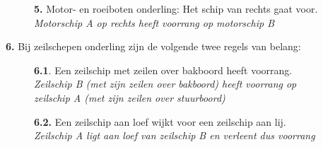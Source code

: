 \vspace{-0.7cm}
\begin{figure}[H]
	\centering
	\begin{minipage}[t]{0.70\textwidth}
		\textbf{5.} Motor- en roeiboten onderling: Het schip van rechts gaat voor.\\
		\textit{Motorschip A op rechts heeft voorrang op motorschip B}
	\end{minipage}
	\hfill
	\begin{minipage}[t]{0.20\textwidth}
		\label{pic:kr5}
	\end{minipage}
	\hfill
\end{figure}

\vspace{-0.7cm}

\textbf{6.} Bij zeilschepen onderling zijn de volgende twee regels van belang:
\vspace{-0.5cm}
\begin{figure}[H]
	\centering
	\hspace{0.02\textwidth}
	\begin{minipage}[t]{0.70\textwidth}
		\textbf{6.1}. Een zeilschip met zeilen over bakboord heeft voorrang.\\
		\textit{Zeilschip B (met zijn zeilen over bakboord) heeft voorrang op \\zeilschip A (met zijn zeilen over stuurboord)}
	\end{minipage}
	\hfill
	\begin{minipage}[t]{0.20\textwidth}
		\label{pic:kr41}
	\end{minipage}
	\hfill
\end{figure}

\vspace{-0.7cm}
\begin{figure}[H]
	\centering
	\hspace{0.02\textwidth}
	\begin{minipage}[t]{0.70\textwidth}
		\textbf{6.2.} Een zeilschip aan loef wijkt voor een zeilschip aan lij.\\
		\textit{Zeilschip A ligt aan loef van zeilschip B en verleent dus voorrang}
	\end{minipage}
	\hfill
	\begin{minipage}[t]{0.20\textwidth}
		\label{pic:kr42}
	\end{minipage}
	\hfill
\end{figure}

